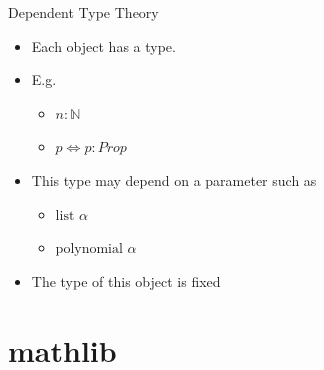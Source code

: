\documentclass{beamer}
\newcommand{\N}{\mathbb{N}}
\begin{document}
\begin{frame}{Dependent Type Theory}
  \begin{itemize}
    \item Each object has a type. 
    \item E.g. 
      \begin{itemize}
        \item $n : \N$
        \item $p \iff  p : Prop$
      \end{itemize}

    \item This type may depend on a parameter such as 
    
    \begin{itemize}
      \item $\text{list } \alpha$
      \item $\text{polynomial } \alpha$
    \end{itemize}



    \item The type of this object is fixed %


  \end{itemize}

\end{frame}


\section {mathlib}
\end{document}
